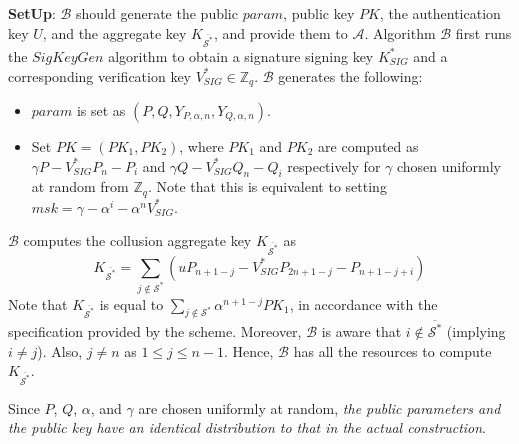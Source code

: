 \noindent\textbf{SetUp}: $\mathcal{B}$ should generate the public $param$, public key $PK$, the authentication key $U$, and the aggregate key $K_{\overline{{\mathcal{S}}^{*}}}$, and provide them to $\mathcal{A}$. Algorithm $\mathcal{B}$ first runs the $SigKeyGen$ algorithm to obtain a signature signing key ${K^{*}_{SIG}}$ and a corresponding verification key ${V^{*}_{SIG}} \in \mathbb{Z}_q$. $\mathcal{B}$ generates the following:
 \begin{itemize}
  \item $param$ is set as $(P,Q,Y_{P,\alpha,n},Y_{Q,\alpha,n})$.
  \item Set $PK=(PK_1,PK_2)$, where $PK_1$ and $PK_2$ are computed as $\gamma P - {V^{*}_{SIG}}P_n - P_i$ and $\gamma Q - {V^{*}_{SIG}}Q_n - Q_i$ respectively for $\gamma$ chosen uniformly at random from $\mathbb{Z}_q$. Note that this is equivalent to setting $msk=\gamma-\alpha^{i}-\alpha^{n}{V^{*}_{SIG}}$.
  \end{itemize}
  \noindent $\mathcal{B}$ computes the collusion aggregate key $K_{\overline{{\mathcal{S}}^{*}}}$ as 
  \begin{equation}
   K_{\overline{{\mathcal{S}}^{*}}} = \sum_{j\notin{\mathcal{S}}^{*}}({u}P_{n+1-j}- {V^{*}_{SIG}}P_{2n+1-j} -P_{n+1-j+i}) \nonumber
  \end{equation}  
\noindent Note that $K_{\overline{{\mathcal{S}}^{*}}}$ is equal to $\sum_{j\notin{\mathcal{S}}^{*}}\alpha^{n+1-j}PK_1$, in accordance with the specification provided by the scheme. Moreover, $\mathcal{B}$ is aware that $i\notin \overline{{\mathcal{S}}^{*}}$ (implying $i\neq j$). Also, $j\neq n$ as $1\leq j \leq n-1$. Hence, $\mathcal{B}$ has all the resources to compute $K_{\overline{{\mathcal{S}}^{*}}}$.

Since $P$, $Q$, $\alpha$, and $\gamma$ are chosen uniformly at random, \emph{the public parameters and the public key have an identical distribution to that in the actual construction}.\\
 
